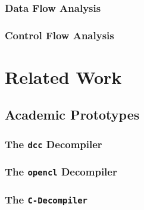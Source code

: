 \documentclass[12pt, a4paper]{article}
\begin{document}

\subsubsection{Data Flow Analysis}

\cite{type_decomp}


\subsubsection{Control Flow Analysis}


\section{Related Work}


\subsection{Academic Prototypes}


\subsubsection{The \texttt{dcc} Decompiler}

\cite{rev_comp}


\subsubsection{The \texttt{opencl} Decompiler}

\cite{decomp_llvm}


\subsubsection{The \texttt{C-Decompiler}}
\end{document}
